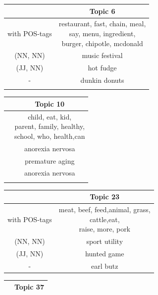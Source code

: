 {%
\begin{table}[h]
	\begin{minipage}[t]{0.5\textwidth}
		\begin{tabular}{c|c}
			&Topic 6\\
			\hline
			with \ac{POS}-tags & \thead{restaurant, fast, chain, meal,\\ say, menu, ingredient,\\ burger, chipotle, mcdonald } \\
			\hline
			(NN, NN) & music festival   \\
			(JJ, NN) & hot fudge \\
			-  & dunkin donuts\\
			&\\
		\end{tabular}
	\end{minipage}
	\begin{minipage}[t]{0.5\textwidth}
		\begin{tabular}{c|c}
			&Topic 10\\
			\hline
			& \thead{child, eat, kid,\\ parent, family,	healthy,\\ school, who, 	health,can } \\
			\hline
			& anorexia nervosa \\
			& premature aging   \\
			& anorexia nervosa	\\
			&\\
		\end{tabular}
	\end{minipage}
	\begin{minipage}[t]{0.5\textwidth}
		\begin{tabular}{c|c}
			&Topic 23\\
			\hline
			with \ac{POS}-tags &  \thead{meat, beef, feed,animal, grass,\\ cattle,eat,\\ raise, more, pork} \\
			\hline
			(NN, NN) & sport utility \\
			(JJ, NN) & hunted game   \\
			-& earl butz	\\
		\end{tabular}
	\end{minipage}
	\hfill\hfill
	\begin{minipage}[t]{0.5\textwidth}
		\begin{tabular}{c|c}
			&Topic 37\\
			\hline


\end{tabular}
\end{minipage}
\end{table}}
